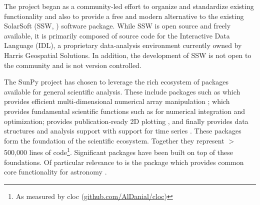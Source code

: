 The project began as a community-led effort to organize and standardize existing functionality and also to provide a  free and modern alternative to the existing SolarSoft (SSW, \citet{Freeland:1998we}) software package. While SSW is open source and freely available, it is primarily composed of source code for the Interactive Data Language (IDL), a proprietary data-analysis environment currently owned by Harris Geospatial Solutions. In addition, the development of SSW is not open to the community and is not version controlled.

The SunPy project has chosen  to leverage the rich ecosystem of packages available for general scientific analysis. These include packages such as
 which provides efficient multi-dimensional numerical array manipulation \citep{numpy} ;  which provides fundamental scientific functions such as for numerical integration and optimization\citep{scipy};  provides publication-ready 2D plotting \citep{matplotlib}, and finally  provides data structures and analysis support with support for time series \citep{pandas}. These packages form the foundation of the scientific \python ecosystem. Together they represent $>$500,000 lines of code\footnote{As measured by cloc (\url{github.com/AlDanial/cloc})}. Significant packages have been built on top of these foundations. Of particular relevance to \sunpypkg is the  package which provides common core functionality for astronomy \citep{astropy2018}. 





